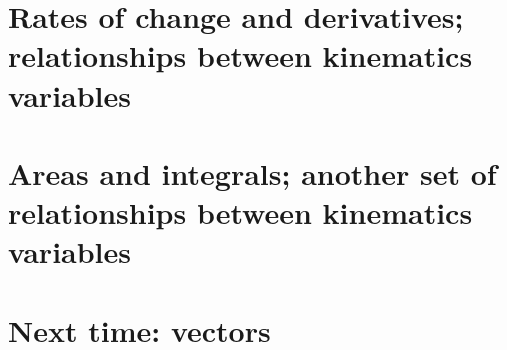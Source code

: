 \documentclass{tufte-handout}
\begin{document}
\section{Rates of change and derivatives; relationships between kinematics variables}

\section{Areas and integrals; another set of relationships between kinematics variables}

\section{Next time: vectors}


\end{document}
